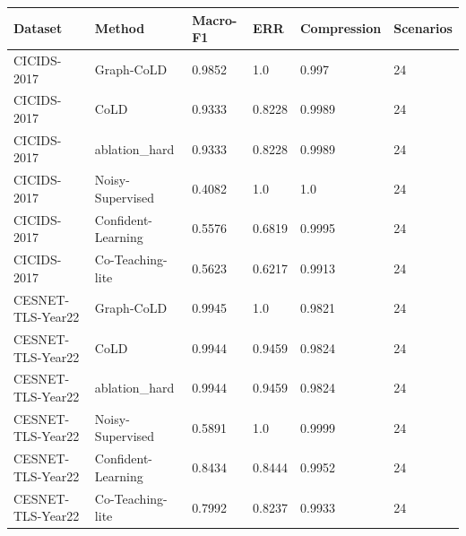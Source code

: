 \small
\begin{tabular}{llllll}
\hline
Dataset & Method & Macro-F1 & ERR & Compression & Scenarios \\
\hline
CICIDS-2017 & Graph-CoLD & 0.9852 & 1.0 & 0.997 & 24 \\
CICIDS-2017 & CoLD & 0.9333 & 0.8228 & 0.9989 & 24 \\
CICIDS-2017 & ablation\_hard & 0.9333 & 0.8228 & 0.9989 & 24 \\
CICIDS-2017 & Noisy-Supervised & 0.4082 & 1.0 & 1.0 & 24 \\
CICIDS-2017 & Confident-Learning & 0.5576 & 0.6819 & 0.9995 & 24 \\
CICIDS-2017 & Co-Teaching-lite & 0.5623 & 0.6217 & 0.9913 & 24 \\
CESNET-TLS-Year22 & Graph-CoLD & 0.9945 & 1.0 & 0.9821 & 24 \\
CESNET-TLS-Year22 & CoLD & 0.9944 & 0.9459 & 0.9824 & 24 \\
CESNET-TLS-Year22 & ablation\_hard & 0.9944 & 0.9459 & 0.9824 & 24 \\
CESNET-TLS-Year22 & Noisy-Supervised & 0.5891 & 1.0 & 0.9999 & 24 \\
CESNET-TLS-Year22 & Confident-Learning & 0.8434 & 0.8444 & 0.9952 & 24 \\
CESNET-TLS-Year22 & Co-Teaching-lite & 0.7992 & 0.8237 & 0.9933 & 24 \\
\hline
\end{tabular}
